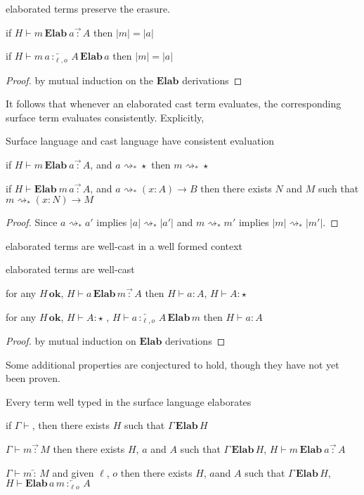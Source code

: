 \begin{thm}
elaborated terms preserve the erasure.
 
if $H\vdash m\,\textbf{Elab}\ a\overrightarrow{\,:\,}A$ then $|m|=|a|$
 
if $H\vdash m\,a\overleftarrow{\,:_{\ell,o}\,}A\,\textbf{Elab}\,a$ then $|m|=|a|$
\end{thm}
 
\begin{proof}
by mutual induction on the $\textbf{Elab}$ derivations
\end{proof}

It follows that whenever an elaborated cast term evaluates, the corresponding surface term evaluates consistently.
Explicitly,
\begin{thm}
Surface language and cast language have consistent evaluation
 
if $H\vdash m\,\textbf{Elab}\ a\overrightarrow{\,:\,}A$, and $a\rightsquigarrow_{*}\star$ then $m\rightsquigarrow_{*}\star$
 
if $H\vdash\textbf{Elab}\ m\,a\overrightarrow{\,:\,}A$, and $a\rightsquigarrow_{*}(x:A)\rightarrow B$ then there exists $N$ and $M$ such that $m\rightsquigarrow_{*}(x:N)\rightarrow M$
\end{thm}


\begin{proof}
Since $a\rightsquigarrow_{*}a'$ implies $|a|\rightsquigarrow_{*}|a'|$ and $m\rightsquigarrow_{*}m'$ implies $|m|\rightsquigarrow_{*}|m'|$.
\end{proof}
elaborated terms are well-cast in a well formed context 
\begin{thm}
elaborated terms are well-cast
 
for any $H\,\textbf{ok}$, $H\vdash a\,\textbf{Elab}\,m\overrightarrow{\,:\,}A$ then $H\vdash a:A$, $H\vdash A:\star$
 
for any $H\,\textbf{ok}$, $H\vdash A:\star$ , $H\vdash a\overleftarrow{\,:_{\ell,o}\,}A\,\textbf{Elab}\,m$ then $H\vdash a:A$
\end{thm}
 
\begin{proof}
by mutual induction on $\textbf{Elab}$ derivations
 

\end{proof}
Some additional properties are conjectured to hold, though they have not yet been proven.
\begin{conjecture}
Every term well typed in the \bidir{} surface language elaborates
 
if $\Gamma\vdash$, then there exists $H$ such that $\Gamma\,\textbf{Elab}\,H$
 
$\Gamma\vdash m\overrightarrow{\,:\,}M$ then there exists $H$, $a$ and $A$ such that $\Gamma\,\textbf{Elab}\,H$, $H\vdash m\,\textbf{Elab}\ a\overrightarrow{\,:\,}A$
 
$\Gamma\vdash m\overleftarrow{\,:\,}M$ and given $\ell$, $o$ then there exists $H$, $a$and $A$ such that $\Gamma\,\textbf{Elab}\,H$, $H\vdash\textbf{Elab}\,a\,m\overleftarrow{\,:_{\ell o}\,}A$
\end{conjecture}
 
